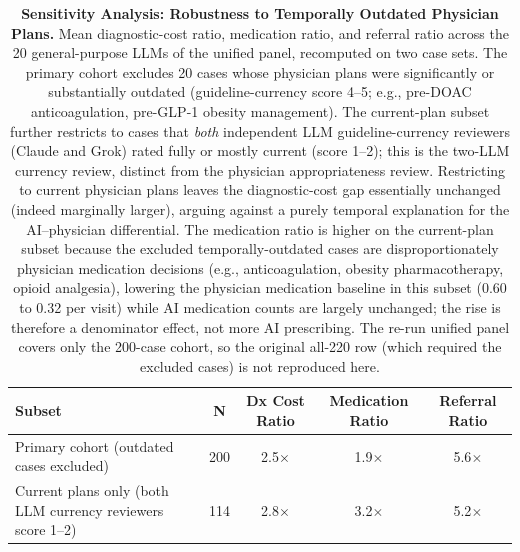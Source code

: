 \begin{table}[h!]
\centering
\small
\caption{\textbf{Sensitivity Analysis: Robustness to Temporally Outdated Physician Plans.} Mean diagnostic-cost ratio, medication ratio, and referral ratio across the 20 general-purpose LLMs of the unified panel, recomputed on two case sets. The primary cohort excludes 20 cases whose physician plans were significantly or substantially outdated (guideline-currency score 4--5; e.g., pre-DOAC anticoagulation, pre-GLP-1 obesity management). The current-plan subset further restricts to cases that \emph{both} independent LLM guideline-currency reviewers (Claude and Grok) rated fully or mostly current (score 1--2); this is the two-LLM currency review, distinct from the physician appropriateness review. Restricting to current physician plans leaves the diagnostic-cost gap essentially unchanged (indeed marginally larger), arguing against a purely temporal explanation for the AI--physician differential. The medication ratio is higher on the current-plan subset because the excluded temporally-outdated cases are disproportionately physician medication decisions (e.g., anticoagulation, obesity pharmacotherapy, opioid analgesia), lowering the physician medication baseline in this subset (0.60 to 0.32 per visit) while AI medication counts are largely unchanged; the rise is therefore a denominator effect, not more AI prescribing. The re-run unified panel covers only the 200-case cohort, so the original all-220 row (which required the excluded cases) is not reproduced here.}
\label{tab:guideline_sensitivity}
\begin{tabular}{l c c c c}
\toprule
\textbf{Subset} & \textbf{N} & \textbf{Dx Cost Ratio} & \textbf{Medication Ratio} & \textbf{Referral Ratio} \\
\midrule
Primary cohort (outdated cases excluded) & 200 & 2.5$\times$ & 1.9$\times$ & 5.6$\times$ \\
\rowcolor{gray!8} Current plans only (both LLM currency reviewers score 1--2) & 114 & 2.8$\times$ & 3.2$\times$ & 5.2$\times$ \\
\bottomrule
\end{tabular}
\end{table}
